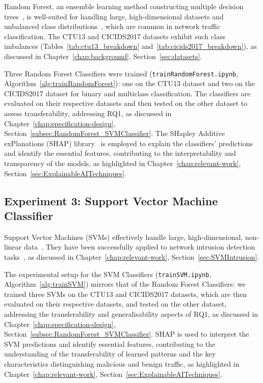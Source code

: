 Random Forest, an ensemble learning method constructing multiple decision trees~\cite{hastie2009random}, is well-suited for handling large, high-dimensional datasets and unbalanced class distributions~\cite{farnaaz2016random}, which are common in network traffic classification. The CTU13 and CICIDS2017 datasets exhibit such class imbalances (Tables~\ref{tab:ctu13_breakdown} and~\ref{tab:cicids2017_breakdown}), as discussed in Chapter~\ref{chap:background}, Section~\ref{sec:datasets}.

Three Random Forest Classifiers were trained (\texttt{trainRandomForest.ipynb}, Algorithm~\ref{alg:trainRandomForest}): one on the CTU13 dataset and two on the CICIDS2017 dataset for binary and multiclass classification. The classifiers are evaluated on their respective datasets and then tested on the other dataset to assess transferability, addressing RQ1, as discussed in Chapter~\ref{chap:specification-design}, Section~\ref{subsec:RandomForest_SVMClassifier}. The SHapley Additive exPlanations (SHAP) library~\cite{lundberg2017unified} is employed to explain the classifiers' predictions and identify the essential features, contributing to the interpretability and transparency of the models, as highlighted in Chapter~\ref{chap:relevant-work}, Section~\ref{sec:ExplainableAITechniques}.

\subsection{Experiment 3: Support Vector Machine Classifier}\label{subsec:support-vector-machine-classifier}

Support Vector Machines (SVMs) effectively handle large, high-dimensional, non-linear data~\cite{cortes1995support, scholkopf2002learning}. They have been successfully applied to network intrusion detection tasks~\cite{kim2003network, teng2017svm}, as discussed in Chapter~\ref{chap:relevant-work}, Section~\ref{sec:SVMIntrusion}.

The experimental setup for the SVM Classifiers (\texttt{trainSVM.ipynb}, Algorithm~\ref{alg:trainSVM}) mirrors that of the Random Forest Classifiers: we trained three SVMs on the CTU13 and CICIDS2017 datasets, which are then evaluated on their respective datasets, and tested on the other dataset, addressing the transferability and generalisability aspects of RQ1, as discussed in Chapter~\ref{chap:specification-design}, Section~\ref{subsec:RandomForest_SVMClassifier}. SHAP is used to interpret the SVM predictions and identify essential features, contributing to the understanding of the transferability of learned patterns and the key characteristics distinguishing malicious and benign traffic, as highlighted in Chapter~\ref{chap:relevant-work}, Section~\ref{sec:ExplainableAITechniques}.

